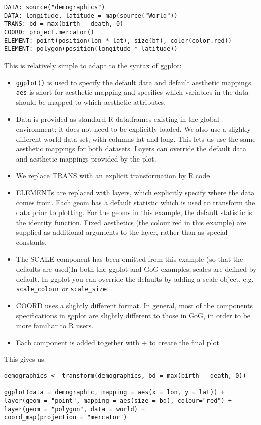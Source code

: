 \begin{verbatim}
DATA: source("demographics")
DATA: longitude, latitude = map(source("World"))
TRANS: bd = max(birth - death, 0)
COORD: project.mercator()
ELEMENT: point(position(lon * lat), size(bf), color(color.red))
ELEMENT: polygon(position(longitude * latitude))
\end{verbatim}

This is relatively simple to adapt to the syntax of ggplot:

\begin{itemize}
	
	\item {\tt ggplot()} is used to specify the default data and default aesthetic mappings.  {\tt aes} is short for aesthetic mapping and specifies which variables in the data should be mapped to which aesthetic attributes.
	
	\item Data is provided as standard R data.frames existing in the global environment; it does not need to be explicitly loaded.  We also use a slightly different world data set, with columns lat and long.  This lets us use the same aesthetic mappings for both datasets. Layers can override the default data and aesthetic mappings provided by the plot. 
	
	\item We replace {\sf TRANS} with an explicit transformation by R code.

	\item {\sf ELEMENT}s are replaced with layers, which explicitly specify where the data comes from.  Each geom has a default statistic which is used to transform the data prior to plotting.  For the geoms in this example, the default statistic is the identity function.  Fixed aesthetics (the colour red in this example) are supplied as additional arguments to the layer, rather than as special constants.

	\item The {\sf SCALE} component has been omitted from this example (so that the defaults are used)In both the ggplot and GoG examples, scales are defined by default.  In ggplot you can override the defaults by adding a scale object, e.g. {\tt scale\_colour} or {\tt scale\_size}

	\item {\sf COORD} uses a slightly different format.  In general, most of the components specifications in ggplot are slightly different to those in GoG, in order to be more familiar to R users.

	\item Each component is added together with $+$ to create the final plot

\end{itemize}

This gives us:

\begin{verbatim}
demographics <- transform(demographics, bd = max(birth - death, 0))

ggplot(data = demographic, mapping = aes(x = lon, y = lat)) + 
layer(geom = "point", mapping = aes(size = bd), colour="red") +
layer(geom = "polygon", data = world) +
coord_map(projection = "mercator")
\end{verbatim}
